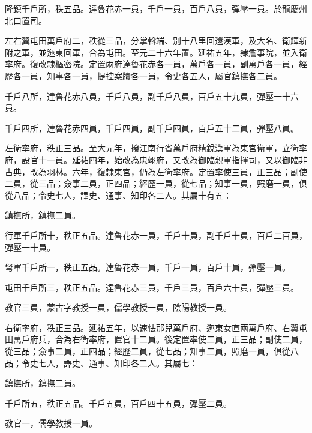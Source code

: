 \begin{pinyinscope}
 隆鎮千戶所，秩五品。達魯花赤一員，千戶一員，百戶八員，彈壓一員。於龍慶州北口置司。



 左右翼屯田萬戶府二，秩從三品，分掌斡端、別十八里回還漢軍，及大名、衛輝新附之軍，並迤東回軍，合為屯田。至元二十六年置。延祐五年，隸詹事院，並入衛率府。復改隸樞密院。定置兩府達魯花赤各一員，萬戶各一員，副萬戶各一員，經歷各一員，知事各一員，提控案牘各一員，令史各五人，屬官鎮撫各二員。



 千戶八所，達魯花赤八員，千戶八員，副千戶八員，百戶五十九員，彈壓一十六員。



 千戶四所，達魯花赤四員，千戶四員，副千戶四員，百戶五十二員，彈壓八員。



 左衛率府，秩正三品。至大元年，撥江南行省萬戶府精銳漢軍為東宮衛軍，立衛率府，設官十一員。延祐四年，始改為忠翊府，又改為御臨親軍指揮司，又以御臨非古典，改為羽林。六年，復隸東宮，仍為左衛率府。定置率使三員，正三品；副使二員，從三品；僉事二員，正四品；經歷一員，從七品；知事一員，照磨一員，俱從八品；令史七人，譯史、通事、知印各二人。其屬十有五：



 鎮撫所，鎮撫二員。



 行軍千戶所十，秩正五品。達魯花赤一員，千戶十員，副千戶十員，百戶二百員，彈壓一十員。



 弩軍千戶所一，秩正五品。達魯花赤一員，千戶一員，百戶十員，彈壓一員。



 屯田千戶所三，秩正五品。達魯花赤三員，千戶三員，百戶六十員，彈壓三員。



 教官三員，蒙古字教授一員，儒學教授一員，陰陽教授一員。



 右衛率府，秩正三品。延祐五年，以速怯那兒萬戶府、迤東女直兩萬戶府、右翼屯田萬戶府兵，合為右衛率府，置官十二員。後定置率使二員，正三品；副使二員，從三品；僉事二員，正四品；經歷二員，從七品；知事二員，照磨一員，俱從八品；令史七人，譯史、通事、知印各二人。其屬七：



 鎮撫所，鎮撫二員。



 千戶所五，秩正五品。千戶五員，百戶四十五員，彈壓二員。



 教官一，儒學教授一員。




\end{pinyinscope}
